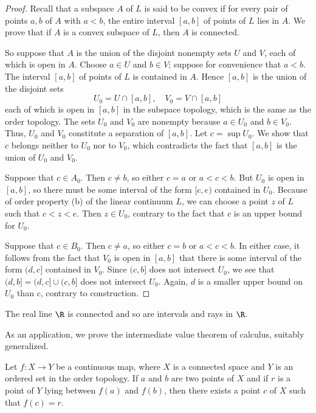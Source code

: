 \begin{proof}
Recall that a subspace $A$ of $L$ is said to be convex if for every pair of points $a,b$ of $A$ with $a<b$, the entire interval $[a,b]$ of points of $L$ lies in $A$. We prove that if $A$ is a convex subspace of $L$, then $A$ is connected.\par
So suppose that $A$ is the union of the disjoint nonempty sets $U$ and $V$, each of which is open in $A$. Choose $a\in U$ and $b\in V$; suppose for convenience that $a<b$. The interval $[a,b]$ of points of $L$ is contained in $A$. Hence $[a,b]$ is the union of the disjoint sets
\[U_0=U\cap[a,b],\quad V_0=V\cap[a,b]\]
each of which is open in $[a,b]$ in the subspace topology, which is the same as the order topology. The sets $U_0$ and $V_0$ are nonempty because $a\in U_0$ and $b\in V_0$. Thus, $U_0$ and $V_0$ constitute a separation of $[a,b]$. Let $c=\sup U_0$. We show that $c$ belongs neither to $U_0$ nor to $V_0$, which contradicts the fact that $[a,b]$ is the union of $U_0$ and $V_0$.\par
Suppose that $c\in A_0$. Then $c\neq b$, so either $c=a$ or $a<c<b$. But $U_0$ is open in $[a,b]$, so there must be some interval of the form $[c,e)$ contained in $U_0$. Because of order property (b) of the linear continuum $L$, we can choose a point $z$ of $L$ such that $c<z<e$. Then $z\in U_0$, contrary to the fact that $c$ is an upper bound for $U_0$.\par
Suppose that $c\in B_0$. Then $c\neq a$, so either $c=b$ or $a<c<b$. In either case, it follows from the fact that $V_0$ is open in $[a,b]$ that there is some interval of the form $(d,c]$ contained in $V_0$. Since $(c,b]$ does not intersect $U_0$, we see that $(d,b]=(d,c]\cup(c,b]$ does not intersect $U_0$. Again, $d$ is a smaller upper bound on $U_0$ than $c$, contrary to construction.
\end{proof}
\begin{corollary}
The real line $\R$ is connected and so are intervals and rays in $\R$.
\end{corollary}
As an application, we prove the intermediate value theorem of calculus, suitably generalized.
\begin{theorem}
Let $f:X\to Y$ be a continuous map, where $X$ is a connected space and $Y$ is an ordered set in the order topology. If $a$ and $b$ are two points of $X$ and if $r$ is a point of $Y$ lying between $f(a)$ and $f(b)$, then
there exists a point $c$ of $X$ such that $f(c)=r$.
\end{theorem}
